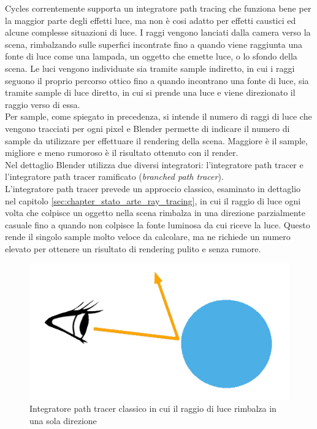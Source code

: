 Cycles correntemente supporta un integratore path tracing che funziona bene per la maggior parte degli effetti luce, ma non è cosi adatto per effetti caustici ed alcune complesse situazioni di luce. I raggi vengono lanciati dalla camera verso la scena, rimbalzando sulle superfici incontrate fino a quando viene raggiunta una fonte di luce come una lampada, un oggetto che emette luce, o lo sfondo della scena. 
Le luci vengono individuate sia tramite sample indiretto, in cui i raggi seguono il proprio percorso ottico fino a quando incontrano una fonte di luce, sia tramite sample di luce diretto, in cui si prende una luce e viene direzionato il raggio verso di essa.
\\
Per sample, come spiegato in precedenza, si intende il numero di raggi di luce che vengono tracciati per ogni pixel e Blender permette di indicare il numero di sample da utilizzare per effettuare il rendering della scena. Maggiore è il sample, migliore e meno rumoroso è il risultato ottenuto con il render.
\\
Nel dettaglio Blender utilizza due diversi integratori: l’integratore path tracer e l’integratore path tracer ramificato (\emph{branched path tracer}).
\\
L’integratore path tracer prevede un approccio classico, esaminato in dettaglio nel capitolo \ref{sec:chapter_stato_arte_ray_tracing}, in cui il raggio di luce ogni volta che colpisce un oggetto nella scena rimbalza in una direzione parzialmente casuale fino a quando non colpisce la fonte luminosa da cui riceve la luce.
Questo rende il singolo sample molto veloce da calcolare, ma ne richiede un numero elevato per ottenere un risultato di rendering pulito e senza rumore.
\\
\begin{figure}[htb]
 \centering
 \includegraphics[width=0.8\linewidth]{images/chapter_tecnologie_abilitanti/tecnologie_abilitanti_sferaluce1.jpg}\hfill
 \caption[Integratore path tracer classico]{Integratore path tracer classico in cui il raggio di luce rimbalza in una sola direzione}
 \label{fig:tecnologie_abilitanti_sferaluce1}
\end{figure}

